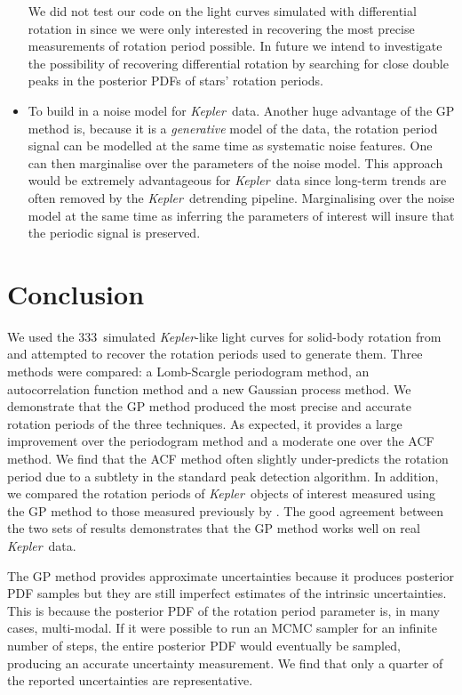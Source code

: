 \documentclass[useAMS, usenatbib, preprint, 12pt]{aastex}
\newcommand{\Kepler}{{\it Kepler}}
\newcommand{\kepler}{\Kepler}
\newcommand{\naigrain}{333}
\begin{document}
\begin{itemize}
{We did not test our code on the light curves simulated with differential
rotation in \citet{Aigrain2015} since we were only interested in recovering
the most precise measurements of rotation period possible.
In future we intend to investigate the possibility of recovering
differential rotation by searching for close double peaks in the posterior
PDFs of stars' rotation periods.}
\item{To build in a noise model for \kepler\ data.
Another huge advantage of the GP method is, because it is a {\it generative}
model of the data, the rotation period signal can be modelled at the same time
as systematic noise features.
One can then marginalise over the parameters of the noise model.
This approach would be extremely advantageous for \kepler\ data since
long-term trends are often removed by the \kepler\ detrending pipeline.
Marginalising over the noise model at the same time as inferring the
parameters of interest will insure that the periodic signal is preserved.}
\end{itemize}

\section{Conclusion}

We used the \naigrain\ simulated \kepler-like light curves for solid-body
rotation from \citet{Aigrain2015} and attempted to recover the rotation
periods used to generate them.
Three methods were compared: a Lomb-Scargle periodogram method, an
autocorrelation function method and a new Gaussian process method.
We demonstrate that the GP method produced the most precise and accurate
rotation periods of the three techniques.
As expected, it provides a large improvement over the periodogram method and a
moderate one over the ACF method.
We find that the ACF method often slightly under-predicts the rotation period
due to a subtlety in the standard peak detection algorithm.
In addition, we compared the rotation periods of \kepler\ objects of
interest measured using the GP method to those measured previously by
\citet{Mcquillan2014}.
The good agreement between the two sets of results demonstrates that the GP
method works well on real \kepler\ data.

The GP method provides approximate uncertainties because it produces posterior
PDF samples but they are still imperfect estimates of the intrinsic
uncertainties.
This is because the posterior PDF of the rotation period parameter is, in many
cases, multi-modal.
If it were possible to run an MCMC sampler for an infinite number of steps,
the entire posterior PDF would eventually be sampled, producing an accurate
uncertainty measurement.
We find that only a quarter of the reported uncertainties are representative.
\end{document}
